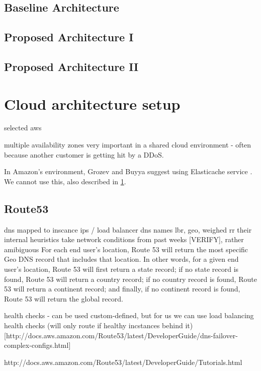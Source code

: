 \documentclass{uvamscse}
\begin{document}
\subsection{Baseline Architecture}

\subsection{Proposed Architecture I}

\subsection{Proposed Architecture II}

\section{Cloud architecture setup} \label{Cloud architecture setup}

selected aws

multiple availability zones very important in a shared cloud environment - often because another customer is getting hit by a DDoS.\cite{GroBuy}

In Amazon’s environment, Grozev and Buyya suggest using Elasticache service \cite{GroBuy}. We cannot use this, also described in \ref{Cloud architecture setup}.

\subsection{Route53}
  dns mapped to inscance ips / load balancer dns names
  lbr, geo, weighed rr
  their internal heuristics take network conditions from past weeks [VERIFY], rather amibiguous
  For each end user’s location, Route 53 will return the most specific Geo DNS record that includes that location. In other words, for a given end user’s location, Route 53 will first return a state record; if no state record is found, Route 53 will return a country record; if no country record is found, Route 53 will return a continent record; and finally, if no continent record is found, Route 53 will return the global record.

  health checks - can be used custom-defined, but for us we can use load balancing health checks (will only route if healthy incstances behind it) [http://docs.aws.amazon.com/Route53/latest/DeveloperGuide/dns-failover-complex-configs.html]

  http://docs.aws.amazon.com/Route53/latest/DeveloperGuide/Tutorials.html
\end{document}
